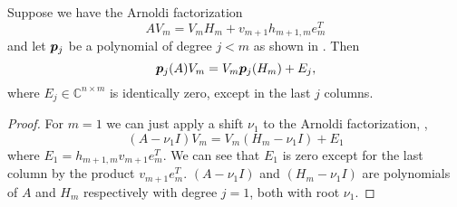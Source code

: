 \begin{thm}\label{thm:ArnoldiPolynomial}
    Suppose we have the Arnoldi factorization
    \begin{equation}
        AV_m = V_mH_m + v_{m+1}h_{m+1,m}e_m^T
    \end{equation}
    and let $\bm{p}_j$ be a polynomial of degree $j < m$ as shown in .  Then
    \begin{equation}
        \bm{p}_j(A)V_m = V_m\bm{p}_j(H_m) + E_j,
        \label{eq:PolyAPolyHDefined}
    \end{equation}
    where $E_j \in \mathbb{C}^{n \times m}$ is identically zero, except in the last $j$ columns.
\end{thm}

\begin{proof}
For $m=1$ we can just apply a shift $\nu_1$ to the Arnoldi factorization, ,
\begin{equation}
    \left(A-\nu_1 I\right)V_m = V_m\left(H_m - \nu_1 I\right) + E_1
    \label{eq:ArnoldiPolynomialDegree1}
\end{equation}
where $E_1 = h_{m+1,m}v_{m+1}e_m^T$.  We can see that $E_1$ is zero except for the last column by the product $ v_{m+1}e_m^T$.  $\left(A-\nu_1 I\right)$ and $\left(H_m - \nu_1 I\right)$ are polynomials of $A$ and $H_m$ respectively with degree $j=1$, both with root $\nu_1$.


\end{proof}
